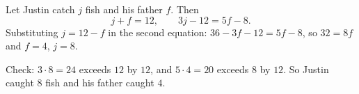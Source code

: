 Let Justin catch $j$ fish and his father $f$. Then
\[
j+f=12,\qquad 3j-12=5f-8 .
\]
Substituting $j=12-f$ in the second equation: $36-3f-12=5f-8$, so $32=8f$ and $f=4$, $j=8$.

Check: $3\cdot8=24$ exceeds $12$ by $12$, and $5\cdot4=20$ exceeds $8$ by $12$. So Justin caught $\boxed{8}$ fish and his father caught $\boxed{4}$.
